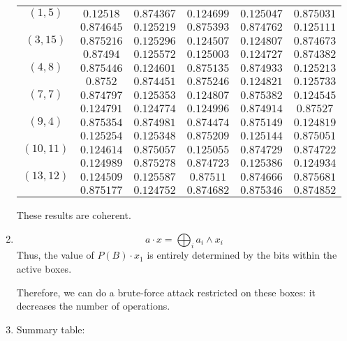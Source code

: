 \begin{enumerate}[label=\textbf{\arabic*})]
    \begin{tabular}{|c|ccccc|}
        \hline
        $(1, 5)$ & $0.12518$ & $0.874367$ & $0.124699$ & $0.125047$ & $0.875031$\\
            & $0.874645$ & $0.125219$ & $0.875393$ & $0.874762$ & $0.125111$\\
        \hline
        $(3, 15)$ & $0.875216$ & $0.125296$ & $0.124507$ & $0.124807$ & $0.874673$\\
            & $0.87494$ & $0.125572$ & $0.125003$ & $0.124727$ & $0.874382$\\
        \hline
        $(4, 8)$ & $0.875446$ & $0.124601$ & $0.875135$ & $0.874933$ & $0.125213$\\
            & $0.8752$ & $0.874451$ & $0.875246$ & $0.124821$ & $0.125733$\\
            \hline
        $(7, 7)$ & $0.874797$ & $0.125353$ & $0.124807$ & $0.875382$ & $0.124545$\\
            & $0.124791$ & $0.124774$ & $0.124996$ & $0.874914$ & $0.87527$\\
            \hline
        $(9, 4)$ & $0.875354$ & $0.874981$ & $0.874474$ & $0.875149$ & $0.124819$\\
            & $0.125254$ & $0.125348$ & $0.875209$ & $0.125144$ & $0.875051$\\
            \hline
        $(10, 11)$ & $0.124614$ & $0.875057$ & $0.125055$ & $0.874729$ & $0.874722$\\
            & $0.124989$ & $0.875278$ & $0.874723$ & $0.125386$ & $0.124934$\\
            \hline
        $(13, 12)$ & $0.124509$ & $0.125587$ & $0.87511$ & $0.874666$ & $0.875681$\\
            & $0.875177$ & $0.124752$ & $0.874682$ & $0.875346$ & $0.874852$\\
        \hline
    \end{tabular}

    These results are coherent.

    \item
    \[a\cdot x = \bigoplus_i a_i \wedge x_i\]
    Thus, the value of $P(B) \cdot x_1$ is entirely determined by the bits within the active boxes.

    Therefore, we can do a brute-force attack restricted on these boxes: it decreases the number of operations.

    \item Summary table:


\end{enumerate}
